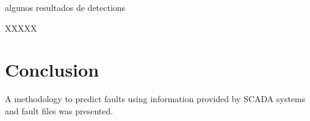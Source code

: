 \documentclass[journal]{IEEEtran}
\begin{document}
algunos resultados de detections


XXXXX
\section{Conclusion}\label{sec:conclusion}
A methodology to predict  faults using information provided by SCADA systems and fault files was presented.



\end{document}
